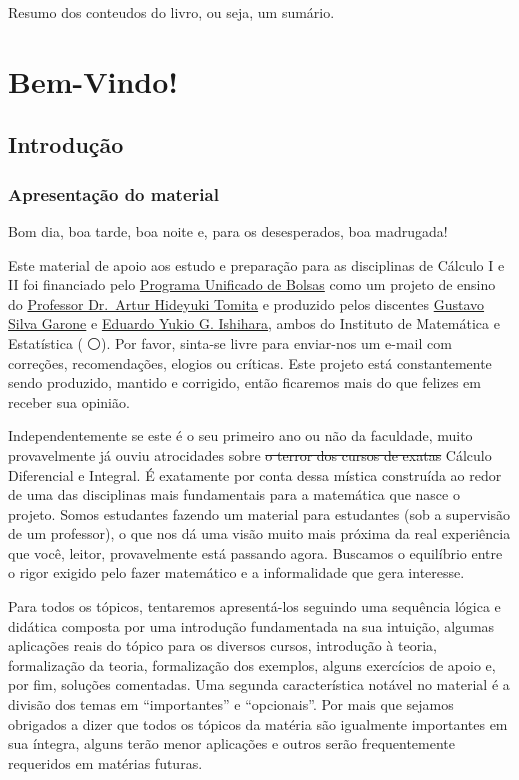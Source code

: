 \documentclass[
  letterpaper,
  DIV=11,
  numbers=noendperiod]{scrreprt}
\begin{document}
Resumo dos conteudos do livro, ou seja, um sumário.

\part{Bem-Vindo!}

\chapter{Introdução}\label{introduuxe7uxe3o}

\section{Apresentação do material}\label{apresentauxe7uxe3o-do-material}

Bom dia, boa tarde, boa noite e, para os desesperados, boa madrugada! 👋

Este material de apoio aos estudo e preparação para as disciplinas de
Cálculo I e II foi financiado pelo
\href{https://prip.usp.br/pub/}{Programa Unificado de Bolsas} como um
projeto de ensino do \href{https://www.ime.usp.br/~tomita/}{Professor
Dr.~Artur Hideyuki Tomita} e produzido pelos discentes
\href{gustavo.garone@usp.br}{Gustavo Silva Garone} e
\href{eduardoyukio.ishihara@usp.br}{Eduardo Yukio G. Ishihara}, ambos do
Instituto de Matemática e Estatística (🔴⚪). Por favor, sinta-se livre
para enviar-nos um e-mail com correções, recomendações, elogios ou
críticas. Este projeto está constantemente sendo produzido, mantido e
corrigido, então ficaremos mais do que felizes em receber sua opinião.

Independentemente se este é o seu primeiro ano ou não da faculdade,
muito provavelmente já ouviu atrocidades sobre \st{o terror dos cursos
de exatas} Cálculo Diferencial e Integral. É exatamente por conta dessa
mística construída ao redor de uma das disciplinas mais fundamentais
para a matemática que nasce o projeto. Somos estudantes fazendo um
material para estudantes (sob a supervisão de um professor), o que nos
dá uma visão muito mais próxima da real experiência que você, leitor,
provavelmente está passando agora. Buscamos o equilíbrio entre o rigor
exigido pelo fazer matemático e a informalidade que gera interesse.

Para todos os tópicos, tentaremos apresentá-los seguindo uma sequência
lógica e didática composta por uma introdução fundamentada na sua
intuição, algumas aplicações reais do tópico para os diversos cursos,
introdução à teoria, formalização da teoria, formalização dos exemplos,
alguns exercícios de apoio e, por fim, soluções comentadas. Uma segunda
característica notável no material é a divisão dos temas em
``importantes'' e ``opcionais''. Por mais que sejamos obrigados a dizer
que todos os tópicos da matéria são igualmente importantes em sua
íntegra, alguns terão menor aplicações e outros serão frequentemente
requeridos em matérias futuras.
\end{document}
